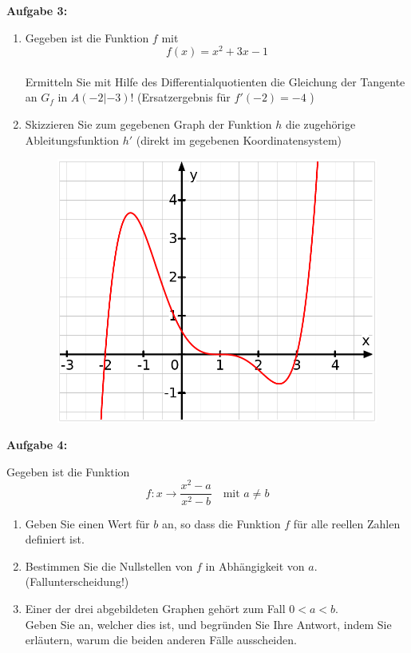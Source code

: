 \documentclass[a4paper,12pt]{article}
\newcommand{\Aufgabe}[1]{
  {
  \vspace*{0.5cm}
  \textsf{\textbf{Aufgabe #1}}
  \vspace*{0.2cm}
  
  }
}
\begin{document}
\Aufgabe{3:}

\begin{enumerate}[label={\alph*)}]
  \item Gegeben ist die Funktion $f$ mit 
    \[ f(x) = x^2+3x-1 \]\\
    Ermitteln Sie mit Hilfe des Differentialquotienten die Gleichung der Tangente an $G_f$ in $A(-2|-3)$! (Ersatzergebnis für $f'(-2)=-4$ )
    \item Skizzieren Sie zum gegebenen Graph der Funktion $h$ die zugehörige Ableitungsfunktion $h'$ (direkt im gegebenen Koordinatensystem)

\begin{figure}[h!]
  \begin{center}
    \includegraphics[width=0.7 \linewidth]{Q11_1KlausurJanuar2022_1.png}
  \end{center}
\end{figure}

\end{enumerate}

\Aufgabe{4:}
Gegeben ist die Funktion 
\[f:x \rightarrow \frac{x^2-a}{x^2-b} \quad \text{mit $a\neq b$}\]

\begin{enumerate}[label={\alph*)}]
  \item Geben Sie einen Wert für $b$ an, so dass die Funktion $f$ für alle reellen Zahlen definiert ist.
  \item Bestimmen Sie die Nullstellen von $f$ in Abhängigkeit von $a$. (Fallunterscheidung!)
  \item Einer der drei abgebildeten Graphen gehört zum Fall $0 < a < b$.\\
    Geben Sie an, welcher dies ist, und begründen Sie Ihre Antwort, indem Sie erläutern, warum die beiden anderen Fälle ausscheiden.
\end{enumerate}
\end{document}
